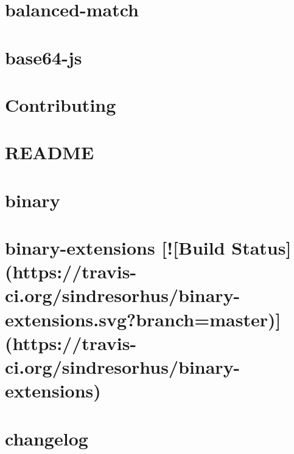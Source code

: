 \documentclass[twoside]{book}
\newcommand{\+}{\discretionary{\mbox{\scriptsize$\hookleftarrow$}}{}{}}
\begin{document}
\chapter{balanced-\/match}
\label{md_dsmacc_examples_DRmerge_node_modules_balanced-match_README}

\chapter{base64-\/js}
\label{md_dsmacc_examples_DRmerge_node_modules_base64-js_README}

\chapter{Contributing}
\label{md_dsmacc_examples_DRmerge_node_modules_bcrypt-pbkdf_CONTRIBUTING}

\chapter{R\+E\+A\+D\+ME}
\label{md_dsmacc_examples_DRmerge_node_modules_bcrypt-pbkdf_README}

\chapter{binary}
\label{md_dsmacc_examples_DRmerge_node_modules_binary_README}

\chapter{binary-\/extensions \mbox{[}!\mbox{[}Build Status\mbox{]}(https\+://travis-\/ci.org/sindresorhus/binary-\/extensions.svg?branch=master)\mbox{]}(https\+://travis-\/ci.org/sindresorhus/binary-\/extensions)}
\label{md_dsmacc_examples_DRmerge_node_modules_binary-extensions_readme}

\chapter{changelog}
\label{md_dsmacc_examples_DRmerge_node_modules_bluebird_changelog}

\end{document}
